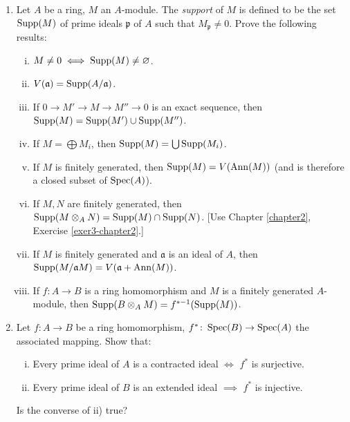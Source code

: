 \begin{enumerate}
    \item \label{exer19-chapter3}Let $A$ be a ring, $M$ an $A$-module. The \emph{support} of $M$ is defined to be the set $\operatorname{Supp}(M)$ of prime ideals $\mathfrak{p}$ of $A$ such that $M_{\mathfrak{p}} \neq 0$. Prove the following results:
    \begin{enumerate}[i)]
        \item $M \neq 0 \iff \operatorname{Supp}(M) \neq \varnothing$.
        \item $V(\mathfrak{a}) = \operatorname{Supp}(A/\mathfrak{a})$.
        \item If $0 \to M' \to M \to M'' \to 0$ is an exact sequence, then $\operatorname{Supp}(M) = \operatorname{Supp}(M') \cup \operatorname{Supp}(M'')$.
        \item If $M = \bigoplus M_i$, then $\operatorname{Supp}(M) = \bigcup \operatorname{Supp}(M_i)$.
        \item If $M$ is finitely generated, then $\operatorname{Supp}(M) = V(\operatorname{Ann}(M))$ (and is therefore a closed subset of $\operatorname{Spec}(A)$).
        \item If $M, N$ are finitely generated, then $\operatorname{Supp}(M \otimes_A N) = \operatorname{Supp}(M) \cap \operatorname{Supp}(N)$. [Use Chapter \ref{chapter2}, Exercise \ref{exer3-chapter2}.]
        \item If $M$ is finitely generated and $\mathfrak{a}$ is an ideal of $A$, then $\operatorname{Supp}(M/\mathfrak{a}M) = V(\mathfrak{a} + \operatorname{Ann}(M))$.
        \item If $f \colon A \to B$ is a ring homomorphism and $M$ is a finitely generated $A$-module, then $\operatorname{Supp}(B \otimes_A M) = f^{*-1}(\operatorname{Supp}(M))$.
    \end{enumerate}

    \item \label{exer20-chapter3}Let $f \colon A \to B$ be a ring homomorphism, $f^* \colon \operatorname{Spec}(B) \to \operatorname{Spec}(A)$ the associated mapping. Show that:
    \begin{enumerate}[i)]
        \item Every prime ideal of $A$ is a contracted ideal $\iff$ $f^*$ is surjective.
        \item Every prime ideal of $B$ is an extended ideal $\implies$ $f^*$ is injective.
    \end{enumerate}
    Is the converse of ii) true?


\end{enumerate}
